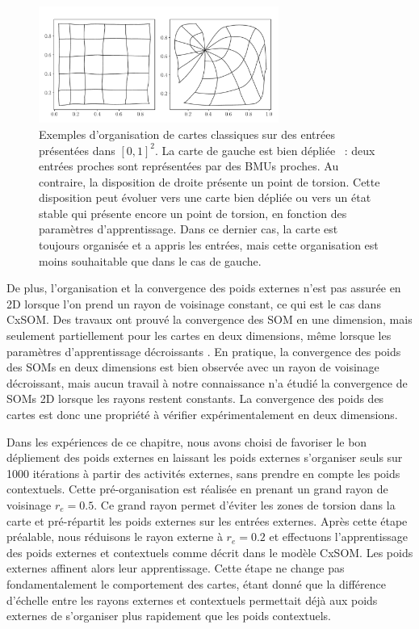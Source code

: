 \documentclass[../main]{subfiles}
\begin{document}
\begin{figure}
	\centering\includegraphics[width=0.7\textwidth]{grid_torsion.pdf}
	\caption{Exemples d'organisation de cartes classiques sur des entrées présentées dans $[0,1]^2$. 
	La carte de gauche est \og bien dépliée \fg{}~: deux entrées proches sont représentées par des BMUs proches. 
	Au contraire, la disposition de droite présente un point de torsion. Cette disposition peut évoluer vers une carte bien dépliée ou vers un état stable qui présente encore un point de torsion, en fonction des paramètres d'apprentissage. Dans ce dernier cas, la carte est toujours organisée et a appris les entrées, mais cette organisation est moins souhaitable que dans le cas de gauche. \label{fig:torsion}
	}
\end{figure}
De plus, l'organisation et la convergence des poids externes n'est pas assurée en 2D lorsque l'on prend un rayon de voisinage constant, ce qui est le cas dans CxSOM.
Des travaux ont prouvé la convergence des SOM en une dimension, mais seulement partiellement pour les cartes en deux dimensions, même lorsque les paramètres d'apprentissage décroissants \cite{flanagan_self-organisation_1996}. 
En pratique, la convergence des poids des SOMs en deux dimensions est bien observée avec un rayon de voisinage décroissant, mais aucun travail à notre connaissance n'a étudié la convergence de SOMs 2D lorsque les rayons restent constants. La convergence des poids des cartes est donc une propriété à vérifier expérimentalement en deux dimensions.

Dans les expériences de ce chapitre, nous avons choisi de favoriser le bon dépliement des poids externes en laissant les poids externes s'organiser seuls sur 1000 itérations à partir des activités externes, sans prendre en compte les poids contextuels. Cette pré-organisation est réalisée en prenant un grand rayon de voisinage $r_e = 0.5$. 
Ce grand rayon permet d'éviter les zones de torsion dans la carte et pré-répartit les poids externes sur les entrées externes. Après cette étape préalable, nous réduisons le rayon externe à $r_e = 0.2$ et effectuons l'apprentissage des poids externes et contextuels comme décrit dans le modèle CxSOM. Les poids externes affinent alors leur apprentissage. 
Cette étape ne change pas fondamentalement le comportement des cartes, étant donné que la différence d'échelle entre les rayons externes et contextuels permettait déjà aux poids externes de s'organiser plus rapidement que les poids contextuels.
\end{document}

